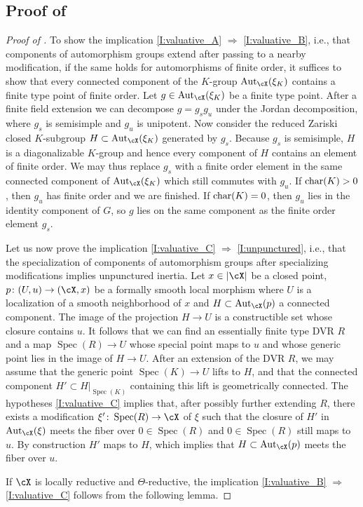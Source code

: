 \documentclass[a4paper]{amsart}
\numberwithin{equation}{section}
\theoremstyle{plain}
\theoremstyle{definition}
\newcommand{\op}[1]{\!\!\mathop{\rm ~#1}\nolimits}
\DeclareMathOperator{\Spec}{Spec}
\DeclareMathOperator{\Aut}{Aut}
\newcommand{\co}{\colon}
\begin{document}
\subsection{Proof of \texorpdfstring{}{Proposition}}

\begin{proof}[Proof of ]
To show the implication \eqref{I:valuative_A} $\Rightarrow$ \eqref{I:valuative_B}, i.e., that components of automorphism groups extend after passing to a nearby modification, if the same holds for automorphisms of finite order,  it suffices to show that every connected component of the $K$-group $\Aut_{\cX}(\xi_K)$ contains a finite type point of finite order. Let $g \in \Aut_{\cX}(\xi_K)$ be a finite type point. After a finite field extension we can decompose $g = g_s g_u$ under the Jordan decomposition, where $g_s$ is semisimple and $g_u$ is unipotent. Now consider the reduced Zariski closed $K$-subgroup $H \subset \Aut_{\cX}(\xi_K)$ generated by $g_s$. Because $g_s$ is semisimple, $H$ is a diagonalizable $K$-group and hence every component of $H$ contains an element of finite order. We may thus replace $g_s$ with a finite order element in the same connected component of $\Aut_{\cX}(\xi_K)$ which still commutes with $g_u$. If $\op{char}(K)>0$, then $g_u$ has finite order and we are finished. If $\op{char}(K)=0$, then $g_u$ lies in the identity component of $G$, so $g$ lies on the same component as the finite order element $g_s$.

Let us now prove the implication \eqref{I:valuative_C} $\Rightarrow$ \eqref{I:unpunctured}, i.e., that the specialization of components of automorphism groups after specializing modifications implies unpunctured inertia. Let $x \in |\cX|$ be a closed point, $p\co (U,u) \to (\cX,x)$ be a {formally} smooth local morphism {where $U$ is a localization of a smooth neighborhood of $x$} and $H \subset \Aut_{\cX}(p)$ a connected component. The image of the projection $H \to U$ is a constructible set whose closure contains $u$. It follows that we can find an essentially finite type DVR $R$ and a map $\Spec(R) \to U$ whose special point maps to $u$ and whose generic point lies in the image of $H \to U$. After an extension of the DVR $R$, we may assume that the generic point $\Spec(K) \to U$ lifts to $H$, and that the connected component $H' \subset H|_{\Spec(K)}$ containing this lift is geometrically connected. The hypotheses {\eqref{I:valuative_C} implies} that, after possibly further extending $R$, there exists a modification $\xi' \co \Spec(R) \to \cX$ of $\xi$ such that the closure of $H'$ in $\Aut_{\cX}(\xi)$ meets the fiber over $0 \in \Spec(R)$ and $0 \in \Spec(R)$ still maps to $u$. By construction $H'$ maps to $H$, which implies that $H \subset \Aut_{\cX}(p)$ meets the fiber over $u$.

If $\cX$ is locally reductive and $\Theta$-reductive, the implication \eqref{I:valuative_B} $\Rightarrow$ \eqref{I:valuative_C} follows from the following lemma.
\end{proof}
\end{document}
